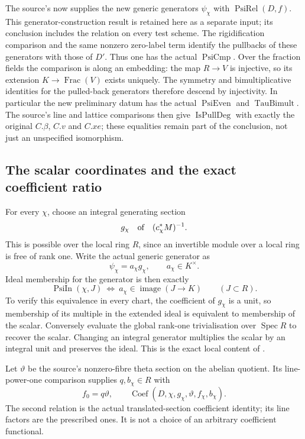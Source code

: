 The source's
 now supplies the new generic generators
\(\psi_\chi\) with \(\operatorname{PsiRel}(D,f)\).
This generator-construction result is retained here as a separate
input; its conclusion includes the relation on every test scheme.
The rigidification comparison and the same nonzero zero-label
term identify the pullbacks of these generators with those of
\(D'\). Thus one has the actual \(\operatorname{PsiCmp}\).
Over the fraction fields the comparison is along an embedding:
the map \(R\to V\) is injective, so its extension
\(K\to\operatorname{Frac}(V)\) exists uniquely.
The symmetry and bimultiplicative identities for the pulled-back
generators therefore descend by injectivity.
In particular the new preliminary datum has the actual
\(\operatorname{PsiEven}\) and \(\operatorname{TauBimult}\).
The source's line and lattice comparisons then give
\(\operatorname{IsPullDeg}\) with exactly the original \(C.\beta\),
\(C.v\) and \(C.xe\); these equalities remain part of the
conclusion, not just an unspecified isomorphism.

\subsection{The scalar coordinates and the exact coefficient ratio}
For every \(\chi\), choose an integral generating section
\[
                 g_\chi\quad\hbox{of}\quad
                      (c_\chi^*M)^{-1}.
\]
This is possible over the local ring \(R\), since an invertible
module over a local ring is free of rank one.
Write the actual generic generator as
\[
                          \psi_\chi=a_\chi g_\chi,
                          \qquad a_\chi\in K^\times.
 \tag{PN2}\label{eq:psi-normalisation-scalar}
\]
Ideal membership for the generator is then exactly
\[
 \operatorname{PsiIn}(\chi,J)
   \ \Longleftrightarrow\
     a_\chi\in\operatorname{image}(J\longrightarrow K)
               \qquad(J\subset R).
 \tag{PN3}\label{eq:psi-normalisation-ideal}
\]
To verify this equivalence in every chart, the coefficient of
\(g_\chi\) is a unit, so membership of its multiple in the
extended ideal is equivalent to membership of the scalar.
Conversely evaluate the global rank-one trivialisation over
\(\operatorname{Spec}R\) to recover the scalar.
Changing an integral generator multiplies the scalar by an
integral unit and preserves the ideal.
This is the exact local content of
.

Let \(\vartheta\) be the source's nonzero-fibre theta section on
the abelian quotient. Its line-power-one comparison supplies
\(q,b_\chi\in R\) with
\[
                  f_0=q\vartheta,\qquad
                  \operatorname{Coef}
                     (D,\chi,g_\chi,\vartheta,f_\chi,b_\chi).
 \tag{PN4}\label{eq:psi-normalisation-coefficients}
\]
The second relation is the actual translated-section coefficient
identity; its line factors are the prescribed ones.
It is not a choice of an arbitrary coefficient functional.

